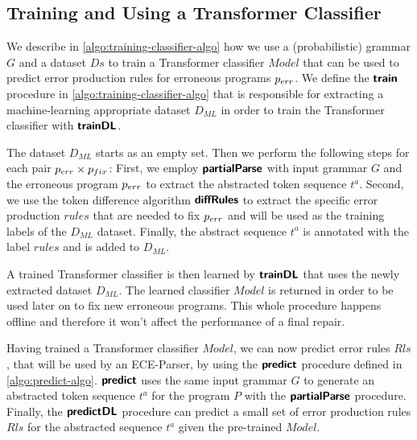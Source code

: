 \subsection{Training and Using a Transformer Classifier}
\label{sec:whole-system:training-classifier}

\begin{figure}[t]
  \centering
  \begin{minipage}[t]{0.47\linewidth}
    \centering
    
  \end{minipage}
  \begin{minipage}[t]{0.52\linewidth}
    \centering
    
  \end{minipage}
\end{figure}

%
We describe in \autoref{algo:training-classifier-algo} how we use a
(probabilistic) grammar $G$ and a dataset $Ds$ to train a Transformer classifier
$Model$ that can be used to predict error production rules for erroneous
programs $p_{err}$. We define the $\bm{\mathsf{train}}$ procedure in
\autoref{algo:training-classifier-algo} that is responsible for extracting a
machine-learning appropriate dataset $D_{ML}$ in order to train the Transformer
classifier with $\bm{\mathsf{trainDL}}$.

The dataset $D_{ML}$ starts as an empty set. Then we perform the following steps
for each pair $p_{err} \times p_{fix}$: First, we employ $\bm{\mathsf{partialParse}}$ with input
grammar $G$ and the erroneous program $p_{err}$ to extract the abstracted token
sequence $t^a$. Second, we use the token difference algorithm $\bm{\mathsf{diffRules}}$ to
extract the specific error production $rules$ that are needed to fix $p_{err}$ and
will be used as the training labels of the $D_{ML}$ dataset. Finally, the
abstract sequence $t^a$ is annotated with the label $rules$ and is added to
$D_{ML}$.

A trained Transformer classifier is then learned by $\bm{\mathsf{trainDL}}$ that uses the
newly extracted dataset $D_{ML}$. The learned classifier $Model$ is returned in
order to be used later on to fix new erroneous programs. This whole procedure
happens offline and therefore it won't affect the performance of a final repair.

%
Having trained a Transformer classifier $Model$, we can now predict error rules
$Rls$, that will be used by an ECE-Parser, by using the $\bm{\mathsf{predict}}$ procedure
defined in \autoref{algo:predict-algo}. $\bm{\mathsf{predict}}$ uses the same input
grammar $G$ to generate an abstracted token sequence $t^a$ for the program $P$
with the $\bm{\mathsf{partialParse}}$ procedure. Finally, the $\bm{\mathsf{predictDL}}$ procedure can
predict a small set of error production rules $Rls$ for the abstracted sequence
$t^a$ given the pre-trained $Model$.

